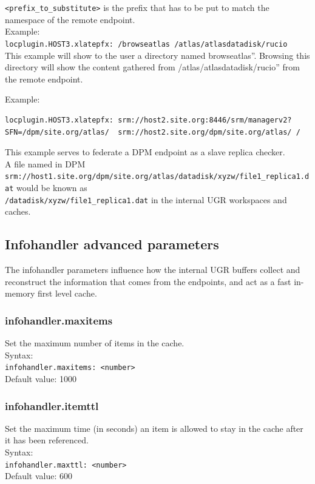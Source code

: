 \documentclass[12pt]{article} %
\begin{document}
\lstinline"<prefix_to_substitute>" is the prefix that has to be put to match the namespace of the remote endpoint.\\

Example:\\

\lstinline"locplugin.HOST3.xlatepfx: /browseatlas /atlas/atlasdatadisk/rucio"\\

This example will show to the user a directory named \lstinline``browseatlas''. Browsing this directory will show the content gathered from \lstinline``/atlas/atlasdatadisk/rucio'' from the remote endpoint.

Example:\\
\begin{lstlisting}
locplugin.HOST3.xlatepfx: srm://host2.site.org:8446/srm/managerv2?SFN=/dpm/site.org/atlas/  srm://host2.site.org/dpm/site.org/atlas/ /
\end{lstlisting}

This example serves to federate a DPM endpoint as a slave replica checker.\\
A file named in DPM \\
\lstinline"srm://host1.site.org/dpm/site.org/atlas/datadisk/xyzw/file1_replica1.dat" would be known as \\
\lstinline"/datadisk/xyzw/file1_replica1.dat" in the internal UGR workspaces and caches.





\subsection{Infohandler advanced parameters}
The infohandler parameters influence how the internal UGR buffers collect  and reconstruct the information that comes from the endpoints, and act as a fast in-memory first level cache.



\subsubsection{infohandler.maxitems}
Set the maximum number of items in the cache.\\
Syntax:\\
\lstinline"infohandler.maxitems: <number>"\\

Default value: 1000

\subsubsection{infohandler.itemttl}
Set the maximum time (in seconds) an item is allowed to stay in the cache after it has been referenced.\\
Syntax:\\
\lstinline"infohandler.maxttl: <number>"\\
Default value: 600
\end{document}
